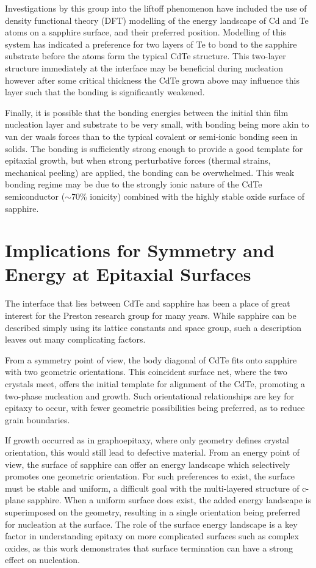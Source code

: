 Investigations by this group into the liftoff phenomenon have included the use of density functional theory (DFT) modelling of the energy landscape of Cd and Te atoms on a sapphire surface, and their preferred position. Modelling of this system has indicated a preference for two layers of Te to bond to the sapphire substrate before the atoms form the typical CdTe structure. This two-layer structure immediately at the interface may be beneficial during nucleation however after some critical thickness the CdTe grown above may influence this layer such that the bonding is significantly weakened.

Finally, it is possible that the bonding energies between the initial thin film nucleation layer and substrate to be very small, with bonding being more akin to van der waals forces than to the typical covalent or semi-ionic bonding seen in solids. The bonding is sufficiently strong enough to provide a good template for epitaxial growth, but when strong perturbative forces (thermal strains, mechanical peeling) are applied, the bonding can be overwhelmed. This weak bonding regime may be due to the strongly ionic nature of the CdTe semiconductor ($\sim$70\% ionicity) combined with the highly stable oxide surface of sapphire.
\section{Implications for Symmetry and Energy at Epitaxial Surfaces}
The interface that lies between CdTe and sapphire has been a place of great interest for the Preston research group for many years. While sapphire can be described simply using its lattice constants and space group, such a description leaves out many complicating factors.

From a symmetry point of view, the body diagonal of CdTe fits onto sapphire with two geometric orientations. This coincident surface net, where the two crystals meet, offers the initial template for alignment of the CdTe, promoting a two-phase nucleation and growth. Such orientational relationships are key for epitaxy to occur, with fewer geometric possibilities being preferred, as to reduce grain boundaries.

If growth occurred as in graphoepitaxy, where only geometry defines crystal orientation, this would still lead to defective material. From an energy point of view, the surface of sapphire can offer an energy landscape which selectively promotes one geometric orientation. For such preferences to exist, the surface must be stable and uniform, a difficult goal with the multi-layered structure of c-plane sapphire. When a uniform surface does exist, the added energy landscape is superimposed on the geometry, resulting in a single orientation being preferred for nucleation at the surface. The role of the surface energy landscape is a key factor in understanding epitaxy on more complicated surfaces such as complex oxides, as this work demonstrates that surface termination can have a strong effect on nucleation.